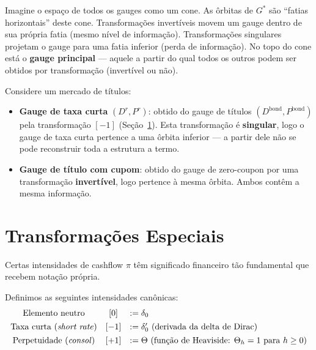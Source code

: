 \begin{obs}
Imagine o espa\c{c}o de todos os gauges como um cone. As \^orbitas de
$G^*$ s\~ao ``fatias horizontais'' deste cone. Transforma\c{c}\~oes
invert\'iveis movem um gauge dentro de sua pr\'opria fatia (mesmo
n\'ivel de informa\c{c}\~ao). Transforma\c{c}\~oes singulares
projetam o gauge para uma fatia inferior (perda de informa\c{c}\~ao).
No topo do cone est\'a o \textbf{gauge principal} --- aquele a partir
do qual todos os outros podem ser obtidos por transforma\c{c}\~ao
(invert\'ivel ou n\~ao).
\end{obs}

\begin{ex}
Considere um mercado de t\'itulos:
\begin{itemize}[nosep]
 \item \textbf{Gauge de taxa curta} $(D^r, P^r)$: obtido do gauge
 de t\'itulos $(D^{\text{bond}}, P^{\text{bond}})$ pela
 transforma\c{c}\~ao $[-1]$ (Se\c{c}\~ao~\ref{sec:especiais}).
 Esta transforma\c{c}\~ao \'e \textbf{singular}, logo o gauge
 de taxa curta pertence a uma \^orbita inferior --- a partir
 dele n\~ao se pode reconstruir toda a estrutura a termo.
 \item \textbf{Gauge de t\'itulo com cupom}: obtido do gauge de
 zero-coupon por uma transforma\c{c}\~ao \textbf{invert\'ivel},
 logo pertence \`a mesma \^orbita. Ambos cont\^em a mesma
 informa\c{c}\~ao.
\end{itemize}
\end{ex}

\section{Transforma\c{c}\~oes Especiais}\label{sec:especiais}

Certas intensidades de cashflow $\pi$ t\^em significado financeiro
t\~ao fundamental que recebem nota\c{c}\~ao pr\'opria.

\begin{defi}\label{def:canonicas}
Definimos as seguintes intensidades can\^onicas:
\[
\begin{array}{ccl}
\text{Elemento neutro} & [0] &:= \delta_0 \\[4pt]
\text{Taxa curta (\textit{short rate})} & [-1] &:= \delta'_0\
 \text{(derivada da delta de Dirac)} \\[4pt]
\text{Perpetuidade (\textit{consol})} & [+1] &:= \Theta\
 \text{(fun\c{c}\~ao de Heaviside: $\Theta_h = 1$ para $h \geq 0$)}
\end{array}
\]
\end{defi}

